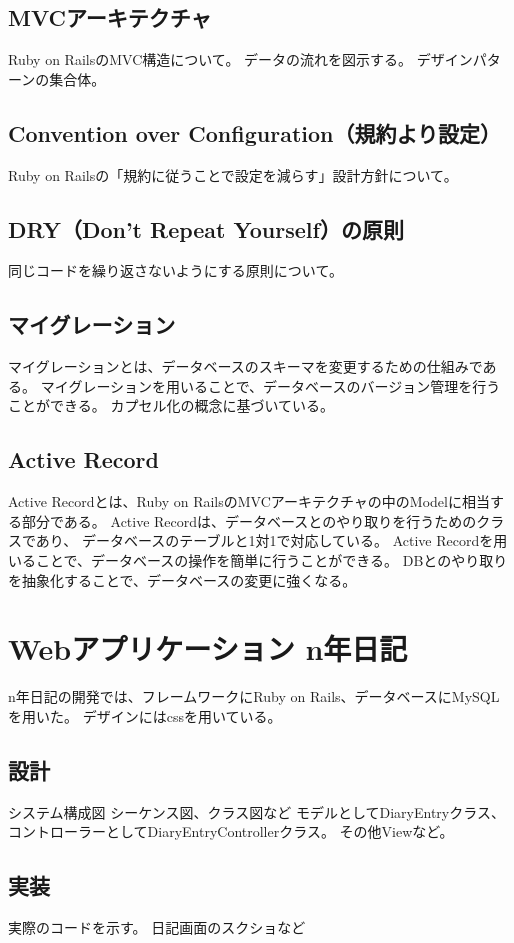 \documentclass[dvipdfmx,fleqn,article]{jlreq}
\begin{document}
\subsection{MVCアーキテクチャ}
Ruby on RailsのMVC構造について。
データの流れを図示する。
デザインパターンの集合体。
\subsection{Convention over Configuration（規約より設定）}
Ruby on Railsの「規約に従うことで設定を減らす」設計方針について。
\subsection{DRY（Don't Repeat Yourself）の原則}
同じコードを繰り返さないようにする原則について。
\subsection{マイグレーション}
マイグレーションとは、データベースのスキーマを変更するための仕組みである。
マイグレーションを用いることで、データベースのバージョン管理を行うことができる。
カプセル化の概念に基づいている。
\subsection{Active Record}
Active Recordとは、Ruby on RailsのMVCアーキテクチャの中のModelに相当する部分である。
Active Recordは、データベースとのやり取りを行うためのクラスであり、
データベースのテーブルと1対1で対応している。
Active Recordを用いることで、データベースの操作を簡単に行うことができる。
DBとのやり取りを抽象化することで、データベースの変更に強くなる。





\section{Webアプリケーション n年日記}
n年日記の開発では、フレームワークにRuby on Rails、データベースにMySQLを用いた。
デザインにはcssを用いている。


\subsection{設計}
システム構成図
シーケンス図、クラス図など
モデルとしてDiaryEntryクラス、コントローラーとしてDiaryEntryControllerクラス。
その他Viewなど。

\subsection{実装}
実際のコードを示す。
日記画面のスクショなど
\end{document}
